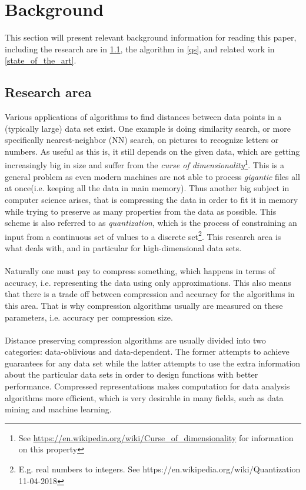 \section{Background}
\label{background}
This section will present relevant background information for reading this paper, including the research are in \ref{research_area}, the \qs{} algorithm in \ref{qs}, and related work in \ref{state_of_the_art}.

\subsection{Research area}
\label{research_area}
Various applications of algorithms to find distances between data points in a (typically large) data set exist. One example is doing similarity search, or more specifically nearest-neighbor (NN) search, on pictures to recognize letters or numbers. As useful as this is, it still depends on the given data, which are getting increasingly big in size and suffer from the \textit{curse of dimensionality}\footnote{See \url{https://en.wikipedia.org/wiki/Curse_of_dimensionality} for information on this property}. This is a general problem as even modern machines are not able to process \textit{gigantic} files all at once(i.e. keeping all the data in main memory). Thus another big subject in computer science arises, that is compressing the data in order to fit it in memory while trying to preserve as many properties from the data as possible. This scheme is also referred to as \textit{quantization}, which is the process of constraining an input from a continuous set of values to a discrete set\footnote{E.g. real numbers to integers. See https://en.wikipedia.org/wiki/Quantization 11-04-2018}. This research area is what \qs{} deals with, and in particular for high-dimensional data sets. 
\\
\\
Naturally one must pay to compress something, which happens in terms of accuracy, i.e. representing the data using only approximations. This also means that there is a trade off between compression and accuracy for the algorithms in this area. That is why compression algorithms usually are measured on these parameters, i.e. accuracy per compression size.
\\
\\
Distance preserving compression algorithms are usually divided into two categories: data-oblivious and data-dependent. The former attempts to achieve guarantees for any data set while the latter attempts to use the extra information about the particular data sets in order to design functions with better performance. Compressed representations makes computation for data analysis algorithms more efficient, which is very desirable in many fields, such as data mining and machine learning\cite{stan15}.

